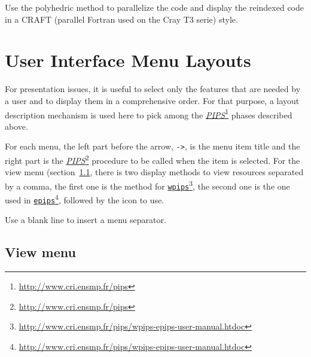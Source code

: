 \documentclass[a4paper]{report}
\newenvironment{PipsMake}{\begin{alltt}}{\end{alltt}}
\newcommand{\LINK}[2]{\href{#2}{#1}\footnote{\url{#2}}\xspace}
\newcommand{\PIPS}{\LINK{\emph{PIPS}}{http://www.cri.ensmp.fr/pips}}
\newcommand{\EPIPS}{\LINK{\texttt{epips}}{http://www.cri.ensmp.fr/pips/wpips-epips-user-manual.htdoc}}
\newcommand{\WPIPS}{\LINK{\texttt{wpips}}{http://www.cri.ensmp.fr/pips/wpips-epips-user-manual.htdoc}}
\begin{document}
Use the polyhedric method to parallelize the code and display the
reindexed code in a CRAFT (parallel Fortran used on the Cray T3 serie)
style.



\chapter{User Interface Menu Layouts}
\label{sec:menu_layout}
\label{section-user-interface-menu-layouts}

For presentation issues, it is useful to select only the features that
are needed by a user and to display them in a comprehensive order. For
that purpose, a layout description mechanism is used here to pick
among the \PIPS{} phases described above.

For each menu, the left part before the arrow, \verb|->|, is the menu
item title and the right part is the \PIPS{} procedure to be called when
the item is selected. For the view menu (section~\ref{sec:view_menu},
there is two display methods to view resources separated by a comma,
the first one is the method for \WPIPS, the second one is the one
used in \EPIPS, followed by the icon to use.

Use a blank line to insert a menu separator.

\section{View menu}
\label{sec:view_menu}
\end{document}
